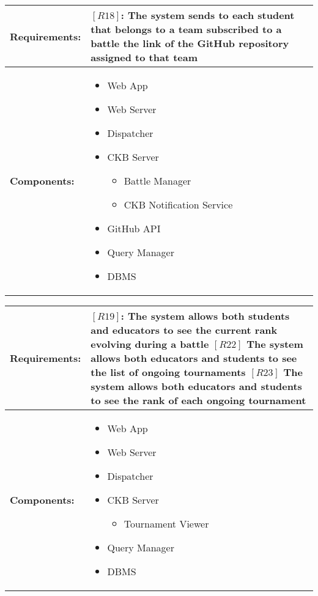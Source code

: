 \begin{table}[H]
  \centering
  \begin{tabularx}{\textwidth}{|p{3cm}|X|}
    \hline
    \textbf{Requirements:} &
    $[R18]$: The system sends to each student that belongs to a team subscribed to a battle the link of the GitHub repository assigned to that team
    \\
    \hline
    \textbf{Components:} & 
    \begin{itemize}
        \item Web App
        \item Web Server 
        \item Dispatcher
        \item CKB Server 
        \begin{itemize}
            \item Battle Manager 
            \item CKB Notification Service
        \end{itemize}
        \item GitHub API
        \item Query Manager 
        \item DBMS
    \end{itemize}
    \\
    \hline
  \end{tabularx}
\end{table}



\begin{table}[H]
  \centering
  \begin{tabularx}{\textwidth}{|p{3cm}|X|}
    \hline
    \textbf{Requirements:} &
    $[R19]$: The system allows both students and educators to see the current rank evolving during a battle 
    \newline$[R22]$ The system allows both educators and students to see the list of ongoing tournaments
    \newline$[R23]$ The system allows both educators and students to see the rank of each ongoing tournament
    \\
    \hline
    \textbf{Components:} & 
    \begin{itemize}
        \item Web App
        \item Web Server 
        \item Dispatcher
        \item CKB Server 
        \begin{itemize}
            \item Tournament Viewer
        \end{itemize}
        \item Query Manager 
        \item DBMS
    \end{itemize}
    \\
    \hline
  \end{tabularx}
\end{table}



